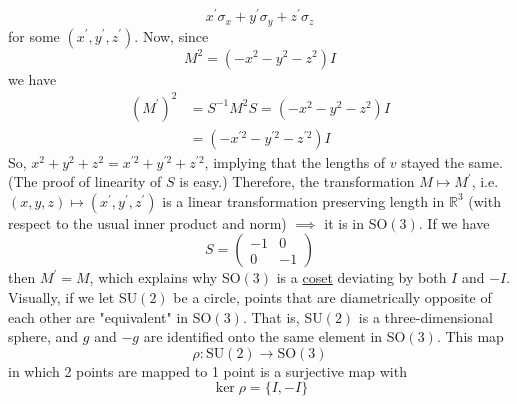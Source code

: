   \begin{equation}
    x^\prime \sigma_x + y^\prime \sigma_y + z^\prime \sigma_z
  \end{equation}
  for some $(x^\prime, y^\prime, z^\prime)$. Now, since 
  \begin{equation}
    M^2 = (-x^2 - y^2 - z^2) I
  \end{equation}
  we have 
  \begin{align*}
    (M^\prime)^2 & = S^{-1} M^2 S = (-x^2 - y^2 - z^2) I \\
    & = (-x^{\prime 2} - y^{\prime 2} - z^{\prime 2}) I 
  \end{align*}
  So, $x^2 + y^2 + z^2 = x^{\prime 2} + y^{\prime 2} + z^{\prime 2}$, implying that the lengths of $v$ stayed the same. (The proof of linearity of $S$ is easy.) Therefore, the transformation $M \mapsto M^\prime$, i.e. $(x, y, z) \mapsto (x^\prime, y^\prime, z^\prime)$ is a linear transformation preserving length in $\mathbb{R}^3$ (with respect to the usual inner product and norm) $\implies$ it is in SO$(3)$. If we have
  \begin{equation}
    S  = \begin{pmatrix}
    -1&0\\0&-1
    \end{pmatrix}
  \end{equation}
  then $M^\prime = M$, which explains why SO$(3)$ is a \hyperref[def:coset]{coset} deviating by both $I$ and $-I$. Visually, if we let SU$(2)$ be a circle, points that are diametrically opposite of each other are "equivalent" in SO$(3)$. That is, SU$(2)$ is a three-dimensional sphere, and $g$ and $-g$ are identified onto the same element in SO$(3)$. This map
  \begin{equation}
    \rho: \text{SU}(2) \rightarrow \text{SO}(3)
  \end{equation}
  in which 2 points are mapped to 1 point is a surjective map with
  \begin{equation}
    \ker{\rho} = \{I, -I\}
  \end{equation}
  \begin{center}
  \end{center}

